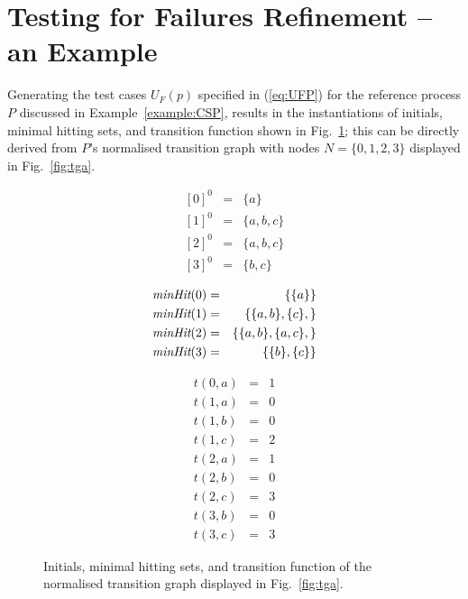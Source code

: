 \section{Testing for Failures Refinement -- an Example}
\label{sec:case}
 
Generating the test cases $U_F(p)$ specified in  (\ref{eq:UFP}) for the reference
process $P$ discussed in Example~\ref{example:CSP},
results in the   instantiations of initials, minimal hitting sets, and
transition function shown in Fig.~\ref{fig:initialsminhitstrans}; 
this can be directly derived from $P$'s normalised
transition graph with nodes $N =\{0,1,2,3\}$ displayed in Fig.~\ref{fig:tga}.


\begin{figure}[htbp]
\begin{center}
\begin{minipage}{0.3\textwidth} 
	 \begin{eqnarray*}
{ }[0]^0 & = & \{ a \} \\
{ }[1]^0 & = & \{ a,b,c \} \\
{ }[2]^0 & = & \{ a,b,c \} \\
{ }[3]^0 & = & \{ b,c \}
\end{eqnarray*}
	\end{minipage}
	\hfill
	\begin{minipage}{0.3\textwidth}
	 \begin{eqnarray*}
\text{\it minHit}(0) & = & \{ \{ a\} \} \\
\text{\it minHit}(1) & = & \{ \{a,b\}, \{c\}, \} \\
\text{\it minHit}(2) & = & \{  \{a,b\},  \{a,c\},\} \\
\text{\it minHit}(3) & = & \{ \{ b\}, \{c\} \} 
\end{eqnarray*}

	\end{minipage}
	\hfill
	\begin{minipage}{0.3\textwidth}
	 \begin{eqnarray*}
t(0,a) & = & 1 \\
t(1,a) & = & 0 \\
t(1,b) & = & 0 \\
t(1,c) & = & 2 \\
t(2,a) & = & 1 \\
t(2,b) & = & 0 \\
t(2,c) & = & 3 \\
t(3,b) & = & 0 \\
t(3,c) &  =& 3
\end{eqnarray*}
	\end{minipage}
\caption{Initials, minimal hitting sets, and transition function of the normalised transition graph displayed in Fig.~\ref{fig:tga}.}
\label{fig:initialsminhitstrans}
\end{center}
\end{figure}


